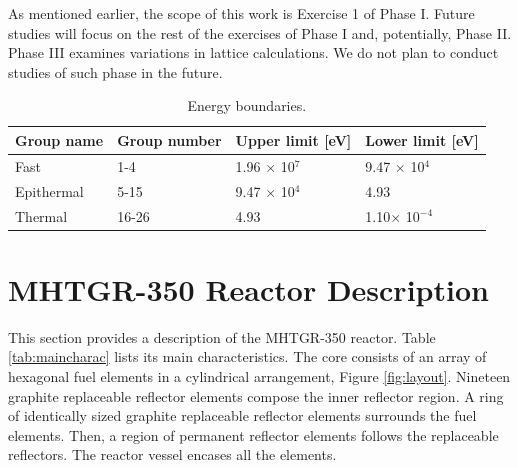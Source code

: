 \documentclass[11pt,letterpaper]{article}
\begin{document}
As mentioned earlier, the scope of this work is Exercise 1 of Phase I.
Future studies will focus on the rest of the exercises of Phase I and, potentially, Phase II.
Phase III examines variations in lattice calculations.
We do not plan to conduct studies of such phase in the future.




\begin{table}[htbp!]
  \centering
  \caption{Energy boundaries.}
  \label{tab:group-struct}
  \begin{tabular}{@{}l l l l}
  \toprule
  Group name & Group number & Upper limit [eV] & Lower limit [eV]       \\
  \midrule
  Fast          & 1-4     & 1.96 $\times$ 10$^7$ & 9.47 $\times$ 10$^4$ \\
  Epithermal    & 5-15    & 9.47 $\times$ 10$^4$ & 4.93   \\
  Thermal       & 16-26   & 4.93 & 1.10$\times$ 10$^{-4}$ \\
  \bottomrule
  \end{tabular}
\end{table}



\section{MHTGR-350 Reactor Description}

This section provides a description of the \gls{MHTGR}-350 reactor.
Table \ref{tab:maincharac} lists its main characteristics.
The core consists of an array of hexagonal fuel elements in a cylindrical arrangement, Figure \ref{fig:layout}.
Nineteen graphite replaceable reflector elements compose the inner reflector region.
A ring of identically sized graphite replaceable reflector elements surrounds the fuel elements.
Then, a region of permanent reflector elements follows the replaceable reflectors.
The reactor vessel encases all the elements.
\end{document}
